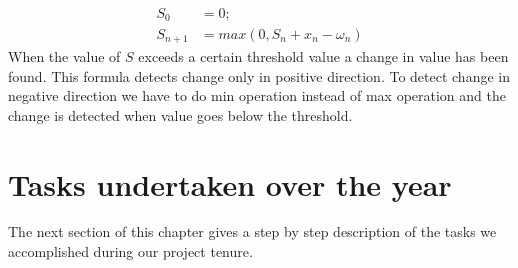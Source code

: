 \begin{align}
S_0 &= 0; \nonumber \\
S_{n+1} &= max(0, S_n + x_n - \omega_n) \nonumber
\end{align}
When the value of $S$ exceeds a certain threshold value a change in value has 
been found. This formula detects change only in positive direction. To detect 
change in negative direction we have to do min operation instead of max 
operation and the change  is detected when value goes below the threshold.







\section{Tasks undertaken over the year}
The next section of this chapter gives a step by step description of the tasks we 
accomplished during our project tenure. 


